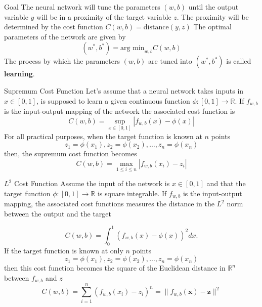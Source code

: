 \documentclass{beamer}
\begin{document}
\begin{frame}{Goal}
	The neural network will tune the parameters $(w,b)$ until the output variable $y$ will be in a proximity of the target variable $z$. The proximity will be determined by the cost function $C(w,b)=\text{distance}(y,z)$
	The optimal parameters of the network are given  by 
	\begin{equation*}
		(w^*,b^*)= \text{arg min}_{w,b} C(w,b)
	\end{equation*}
	The process by which the parameters $(w,b)$ are tuned into $(w^*,b^*)$ is called \textbf{learning}.
\end{frame}

\begin{frame}{Supremum Cost Function}
	Let's assume that a neural network takes inputs in $x\in [0,1]$, is supposed to learn a given continuous function $\phi \colon [0,1] \to \mathbb{R}$. If $f_{w,b}$ is the input-output mapping of the network the associated cost function is 
	\begin{equation*}
		C(w,b)=\sup_{x \in [0,1]} |f_{w,b}(x)-\phi(x) |
	\end{equation*}
	For all practical purposes, when the target function is known at $n$ points
	\begin{equation*}
		z_1=\phi(x_1), z_2=\phi(x_2), \ldots, z_n= \phi(x_n)
	\end{equation*}
	then, the supremum cost function becomes
	\begin{equation*}
		C(w,b)= \max_{1\le i\le n} |f_{w,b}(x_i)- z_i|
	\end{equation*}
\end{frame}

\begin{frame}{$L^2$ Cost Function}
	Assume the input of the network is $x\in [0,1]$ and that the target function $\phi\colon [0,1] \to \mathbb{R}$ is square integrable. If $f_{w,b}$ is the input-output mapping, the associated cost functions measures the distance in the $L^2$ norm between the output and the target
	
	\begin{equation*}
		C(w,b)= \int_{0}^{1} (f_{w,b}(x)-\phi(x))^2 dx.
	\end{equation*}
	If the target function is known at only $n$ points
		\begin{equation*}
		z_1=\phi(x_1), z_2=\phi(x_2), \ldots, z_n= \phi(x_n)
	\end{equation*}
	then this cost function becomes the square of the Euclidean distance in $\mathbb{R}^n$ between $f_{w,b}$ and $z$
	\begin{equation*}
		C(w,b)=\sum_{i=1}^n (f_{w,b}(x_i)- z_i)^n= \| f_{w,b}(\textbf{x})-\textbf{z}\|^2
	\end{equation*}
\end{frame}
\end{document}
